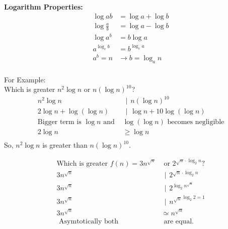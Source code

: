 \documentclass{article}
\newcommand{\bioperation}{{\hspace{5pt} | \hspace{5pt}}}
\begin{document}
\textbf{Logarithm Properties: } \\
\[ 
\begin{aligned}
    \log{ab} &= \log{a} + \log{b} \\
    \log{\frac{a}{b}} &= \log{a} - \log{b} \\
    \log{a^b} &= b\log{a} \\
    a^{\log_c{b}} &= b^{\log_c{a}} \\
    a^b = n &\rightarrow b = \log_a{n} \\
\end{aligned}
\]

For Example: \\
Which is greater $n^2\log{n} \text{ or } n{(\log{n})}^{10}$? \\
\[
\begin{aligned}
    n^2\log{n} &\bioperation n{(\log{n})}^{10} \\
    2\log{n} + \log(\log{n}) &\bioperation \log{n} + 10{\log(\log{n})} \\
    \text{Bigger term is $\log{n}$ and } &\log({\log{n}}) \text{ becomes negligible}\\
    2\log{n} &\geq \log{n} \\
\end{aligned}
\]
So, $n^2\log{n}$ is greater than $n{(\log{n})}^{10}$.

\[
\begin{aligned}
    \text{Which is greater } f(n) = 3n^{\sqrt{n}} &\text{ or } 2^{\sqrt{n}\cdot \log_2{n}}? \\
    3n^{\sqrt{n}} &\bioperation 2^{\sqrt{n}\cdot \log_2{n}} \\
    3n^{\sqrt{n}} &\bioperation 2^{\log_2{n^{\sqrt{n}}}} \\
    3n^{\sqrt{n}} &\bioperation {n^{\sqrt{n}}}^{\log_2{2} = 1} \\
    3n^{\sqrt{n}} &\simeq  n^{\sqrt{n}} \\
    \text{ Asymtotically both} &\text{ are equal.} \\
\end{aligned}
\]
\end{document}
